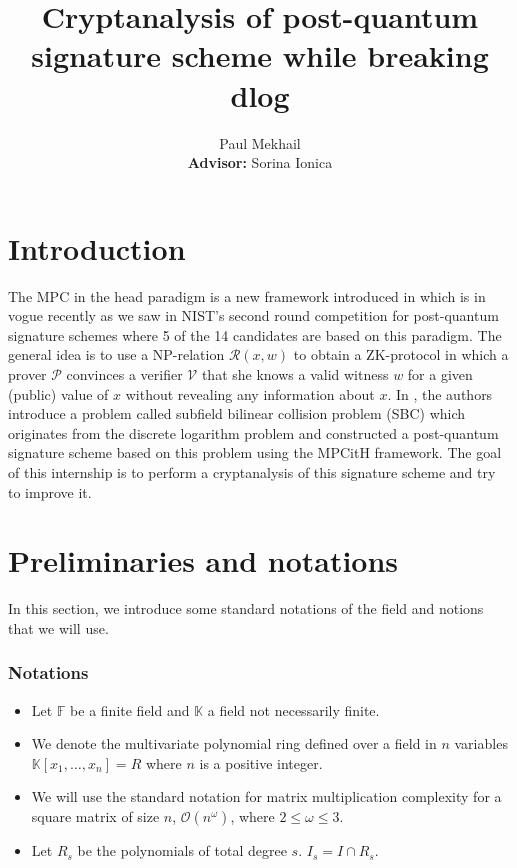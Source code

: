 \documentclass[english]{article}
\author{Paul Mekhail\\ \textbf{Advisor:} Sorina Ionica}
\title{Cryptanalysis of post-quantum signature scheme while breaking dlog}
\begin{document}
	\maketitle
	
	\section{Introduction}
		The MPC in the head paradigm is a new framework introduced in \cite{IKOS07} which is in vogue recently as we saw in NIST's second round competition for post-quantum signature schemes where 5 of the 14 candidates are based on this paradigm.
		The general idea is to use a NP-relation $\mathcal{R}(x, w)$ to obtain a ZK-protocol in which a prover $\mathcal{P}$ convinces a verifier $\mathcal{V}$ that she knows a valid witness $w$ for a given (public) value of $x$ without revealing any information about $x$.
		In \cite{HJ23}, the authors introduce a problem called subfield bilinear collision problem (SBC) which originates from the discrete logarithm problem and constructed a post-quantum signature scheme based on this problem using the MPCitH framework.
		The goal of this internship is to perform a cryptanalysis of this signature scheme and try to improve it.
		
	\section{Preliminaries and notations}
		In this section, we introduce some standard notations of the field and notions that we will use.
		
		\subsubsection{Notations}
		
		\begin{itemize}
			\item Let $\mathbb{F}$ be a finite field and $\mathbb{K}$ a field not necessarily finite. 
			\item We denote the multivariate polynomial ring defined over a field in $n$ variables $\mathbb{K}[x_1,\dots,x_n] = R$ where $n$ is a positive integer.
			\item We will use the standard notation for matrix multiplication complexity for a square matrix of size $n$, $\mathcal{O}(n^\omega)$,
			where $2 \leq \omega \leq 3$.
			\item Let $R_{s}$ be the polynomials of total degree $s$. $I_{s} = I \cap R_{s}$.
		\end{itemize}
		
\end{document}
